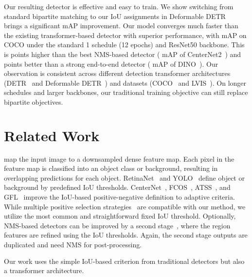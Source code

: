 \documentclass[10pt,twocolumn,letterpaper]{article}
\newcommand{\myparagraph}[1]{\vspace{2pt}\noindent{\textbf{#1}}}
\newcommand{\nmsdets}{{NMS-based detectors\xspace}}
\begin{document}
Our resulting detector is effective and easy to train.
We show switching from standard bipartite matching to our IoU assignments in Deformable DETR~\cite{zhu2020deformable} brings a significant  mAP improvement.
Our model converges much faster than the existing transformer-based detector with superior performance, with  mAP on COCO under the standard 1 schedule (12 epochs) and ResNet50 backbone.
This is  points higher than the best NMS-based detector ( mAP of CenterNet2~\cite{zhou2021probablistic}) and  points better than a strong end-to-end detector ( mAP of DINO~\cite{zhang2022dino}).
Our observation is consistent across different detection transformer architectures (DETR~\cite{carion2020end} and Deformable DETR~\cite{zhu2020deformable}) and datasets (COCO~\cite{lin2014coco} and LVIS~\cite{gupta2019lvis}).
On longer schedules and larger backbones, our traditional training objective can still replace bipartite objectives.


\section{Related Work}


\myparagraph{Traditional \nmsdets} map the input image to a downsampled dense feature map.
Each pixel in the feature map is classified into an object class or background, resulting in overlapping predictions for each object.
RetinaNet~\cite{lin2017focal} and YOLO~\cite{redmon2016you,redmon2017yolo9000,redmon2018yolov3} define object or background by predefined IoU thresholds.
CenterNet~\cite{zhou2019objects}, FCOS~\cite{tian2019fcos}, ATSS~\cite{zhang2020bridging}, and GFL~\cite{li2020generalized} improve the IoU-based positive-negative definition to adaptive criteria.
While multiple positive selection strategies~\cite{zhang2020bridging,chen2021you} are compatible with our method, we utilize the most common and straightforward fixed IoU threshold.
Optionally, NMS-based detectors can be improved by a second stage~\cite{ren2015faster,he2017mask,cai2018cascade,chen2019hybrid,zhou2021probablistic}, 
where the region features are refined using the IoU thresholds.
Again, the second stage outputs are duplicated and need NMS for post-processing.

Our work uses the simple IoU-based criterion from traditional detectors but also a transformer architecture.
\end{document}
